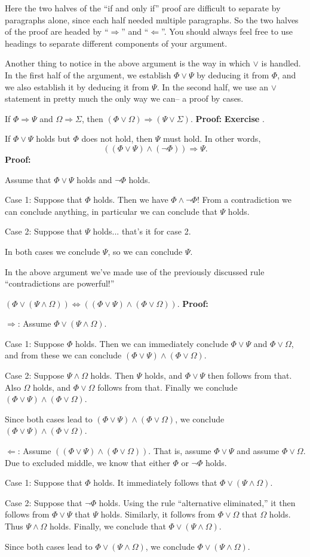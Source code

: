 \documentclass[12pt]{article}
\newcommand{\AND}{\wedge}
\newcommand{\OR}{\vee}
\newcommand{\ARR}{\Rightarrow}
\newcommand{\DARR}{\Leftrightarrow}
\newcounter{exercise}
\newcounter{rule}
\def\putExerciseHeading{\refstepcounter{exercise} \textbf{Exercise \theexercise}}
\def\putRuleNumber{\refstepcounter{rule}\therule}
\newcommand{\DRULEPF}[3]{\begin{tcolorbox}[title=Derived Rule \putRuleNumber: #1,colbacktitle=white,coltitle=black,colback=white] {#2} \tcblower \textbf{Proof:} {#3} \end{tcolorbox}}
\newcommand{\DRULEPZ}[2]{\begin{tcolorbox}[title=Derived Rule \putRuleNumber: #1,colbacktitle=white,coltitle=black,colback=white] {#2} \tcblower \textbf{Proof:} 
                         \putExerciseHeading. \end{tcolorbox}}
\def\pA{\Phi}
\def\pB{\Psi}
\def\pC{\Omega}
\def\pD{\Sigma}
\begin{document}
Here the two halves of the ``if and only if'' proof are difficult to separate by paragraphs alone, since each half needed multiple paragraphs.
So the two halves of the proof are headed by ``$\Rightarrow$'' and ``$\Leftarrow$''.
You should always feel free to use headings to separate different components of your argument.

Another thing to notice in the above argument is the way in which $\OR$ is handled.
In the first half of the argument, we establish $\pA\OR\pB$ by deducing it from $\pA$, and we also establish it by deducing it from $\pB$.
In the second half, we use an $\OR$ statement in pretty much the only way we can-- a proof by cases.

\DRULEPZ{}{If $\pA\ARR\pB$ and $\pC\ARR\pD$, then $(\pA\OR\pC)\ARR(\pB\OR\pD)$.}

\DRULEPF{Alternative Eliminated\label{DRULE:alt_elim}}{
If $\pA\OR\pB$ holds but $\pA$ does not hold, then $\pB$ must hold.
In other words,
$$((\pA\OR\pB)\AND(\neg\pA))\ARR\pB.$$
}{
Assume that $\pA\OR\pB$ holds and $\neg\pA$ holds.
\lsp

Case 1: Suppose that $\pA$ holds.
Then we have $\pA\AND\neg\pA$! From a contradiction we can conclude anything, in particular we can conclude that $\pB$ holds.
\lsp

Case 2: Suppose that $\pB$ holds... that's it for case 2.
\lsp

In both cases we conclude $\pB$, so we can conclude $\pB$.
}

In the above argument we've made use of the previously discussed rule ``contradictions are powerful!''


\DRULEPF{Or Distributes over And}{
$(\pA\OR(\pB\AND\pC))\DARR((\pA\OR\pB)\AND(\pA\OR\pC))$.
}{
$\Rightarrow$:
Assume $\pA\OR(\pB\AND\pC)$.
\lsp

Case 1: Suppose $\pA$ holds. Then we can immediately conclude $\pA\OR\pB$ and $\pA\OR\pC$, and from these
we can conclude $(\pA\OR\pB)\AND(\pA\OR\pC)$.
\lsp

Case 2: Suppose $\pB\AND\pC$ holds.
Then $\pB$ holds, and $\pA\OR\pB$ then follows from that.
Also $\pC$ holds, and $\pA\OR\pC$ follows from that.
Finally we conclude $(\pA\OR\pB)\AND(\pA\OR\pC)$.
\lsp

Since both cases lead to $(\pA\OR\pB)\AND(\pA\OR\pC)$, we conclude $(\pA\OR\pB)\AND(\pA\OR\pC)$.
\lsp

$\Leftarrow$: Assume $((\pA\OR\pB)\AND(\pA\OR\pC))$.
That is, assume $\pA\OR\pB$ and assume $\pA\OR\pC$.
Due to excluded middle, we know that either $\pA$ or $\neg\pA$ holds.
\lsp

Case 1: Suppose that $\pA$ holds. It immediately follows that $\pA\OR(\pB\AND\pC)$.
\lsp

Case 2: Suppose that $\neg\pA$ holds. Using the rule ``alternative eliminated,''
it then follows from $\pA\OR\pB$ that $\pB$ holds.
Similarly, it follows from $\pA\OR\pC$ that $\pC$ holds. Thus $\pB\AND\pC$ holds.
Finally, we conclude that $\pA\OR(\pB\AND\pC)$.
\lsp

Since both cases lead to $\pA\OR(\pB\AND\pC)$, we conclude $\pA\OR(\pB\AND\pC)$.
}
\end{document}
